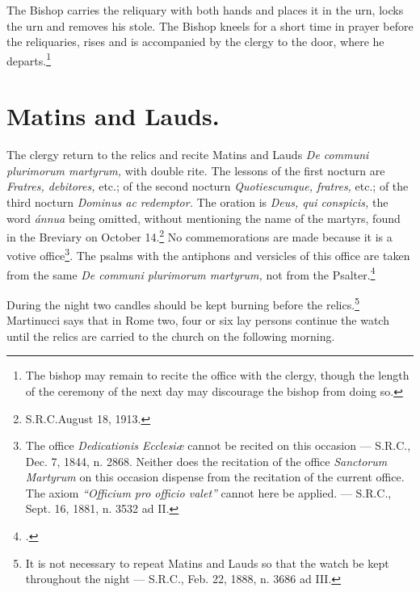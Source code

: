 \documentclass[letterpaper]{report}
\newcommand\src{\textsc{S.R.C.}}
\begin{document}
{    \rubric The Bishop carries the reliquary with both hands and places it in the
    urn, locks the urn and removes his stole. The Bishop kneels for a short time in
    prayer before the reliquaries, rises and is accompanied by the clergy to the
    door, where he departs.\footnote{The bishop may remain to recite the office
    with the clergy, though the length of the ceremony of the next day may
    discourage the bishop from doing so.}

    \section{Matins and Lauds.}

    \rubric The clergy return to the relics and recite Matins and Lauds
    \textit{De communi plurimorum martyrum,} with double rite. The lessons of
    the first nocturn are \textit{Fratres, debitores,} etc.; of the second
    nocturn \textit{Quotiescumque, fratres,} etc.; of the third nocturn
    \textit{Dominus ac redemptor.} The oration is \textit{Deus, qui conspicis,}
    the word \textit{\'annua} being omitted, without mentioning the name of the
    martyrs, found in the Breviary on October 14.\footnote{\src August 18,
    1913.} No commemorations are made because it is a votive
    office\footnote{The office \textit{Dedicationis Ecclesi\ae} cannot be
    recited on this occasion --- \src, Dec. 7, 1844, n. 2868. Neither does the
    recitation of the office \textit{Sanctorum Martyrum} on this occasion
    dispense from the recitation of the current office. The axiom
    \textit{``Officium pro officio valet''} cannot here be applied. --- \src,
    Sept. 16, 1881, n. 3532 ad II.}. The psalms with the antiphons and
    versicles of this office are taken from the same \textit{De communi
    plurimorum martyrum,} not from the Psalter.\footcite[][n. 738.]{ml:1947}

    \rubric During the night two candles should be kept burning before the
    relics.\footnote{It is not necessary to repeat Matins and Lauds so that the
    watch be kept throughout the night --- \src, Feb. 22, 1888, n. 3686 ad
    III.} Martinucci says that in Rome two, four or six lay persons continue
    the watch until the relics are carried to the church on the following
    morning.

}
\end{document}
